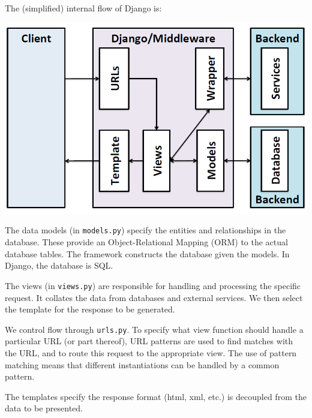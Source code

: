 \documentclass[a4paper, openany]{memoir}
\begin{document}
    \noindent The (simplified) internal flow of Django is:
    \begin{center}
        \includegraphics[scale=0.6]{src/L3I1.PNG}
    \end{center}
    The data models (in \texttt{models.py}) specify the entities and relationships in the database. These provide an Object-Relational Mapping (ORM) to the actual database tables. The framework constructs the database given the models. In Django, the database is SQL.

    \noindent The views (in \texttt{views.py}) are responsible for handling and processing the specific request. It collates the data from databases and external services. We then select the template for the response to be generated.

    \noindent We control flow through \texttt{urls.py}. To specify what view function should handle a particular URL (or part thereof), URL patterns are used to find matches with the URL, and to route this request to the appropriate view. The use of pattern matching means that different instantiations can be handled by a common pattern.

    \noindent The templates specify the response format (html, xml, etc.) is decoupled from the data to be presented.
\end{document}
